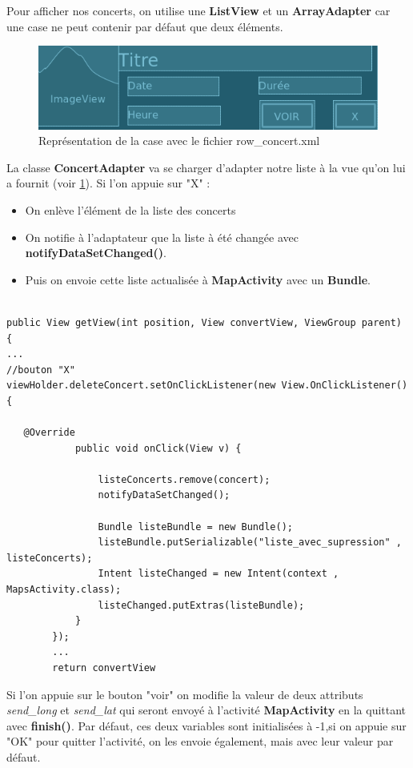 \documentclass{article}
\begin{document}
Pour afficher nos concerts, on utilise une \textbf{ListView} et un \textbf{ArrayAdapter} car une case ne peut contenir par défaut que deux éléments. 
\begin{figure}[h!]
\centering
\includegraphics[scale=0.4]{./img/row_concert.png}
\caption{Représentation de la case avec le fichier row\_concert.xml \label{fig:row_concert}}
\end{figure}

La classe \textbf{ConcertAdapter} va se charger d'adapter notre liste à la vue qu'on lui a fournit (voir \ref{fig:row_concert}).
Si l'on appuie sur "X" : 
\begin{itemize}
\item On enlève l'élément de la liste des concerts
\item On notifie à l'adaptateur que la liste à été changée avec \textbf{notifyDataSetChanged()}.
\item Puis on envoie cette liste actualisée à \textbf{MapActivity} avec un \textbf{Bundle}.
\end{itemize}
\begin{verbatim}

public View getView(int position, View convertView, ViewGroup parent) {
...
//bouton "X"
viewHolder.deleteConcert.setOnClickListener(new View.OnClickListener() {

   @Override
            public void onClick(View v) {

                listeConcerts.remove(concert);
                notifyDataSetChanged();

                Bundle listeBundle = new Bundle();
                listeBundle.putSerializable("liste_avec_supression" , listeConcerts);
                Intent listeChanged = new Intent(context , MapsActivity.class);
                listeChanged.putExtras(listeBundle);
			}
		});
        ...
        return convertView
\end{verbatim}
Si l'on appuie sur le bouton "voir" on modifie la valeur de deux attributs \textit{send\_long} et \textit{send\_lat} qui seront envoyé à l'activité \textbf{MapActivity} en la quittant avec \textbf{finish()}. Par défaut, ces deux variables sont initialisées à -1,si on appuie sur "OK" pour quitter l'activité, on les envoie également, mais avec leur valeur par défaut.
\end{document}
